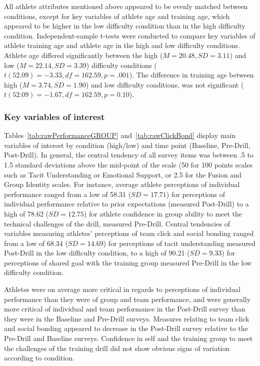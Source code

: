 \begin{CJK}{UTF8}{gbsn}
All athlete attributes mentioned above appeared to be evenly matched between conditions, except for key variables of athlete age and training age, which appeared to be higher in the low difficulty condition than in the high difficulty condition. Independent-sample t-tests were conducted to compare key variables of athlete training age and athlete age in the high and low difficulty conditions. Athlete age differed significantly between the high ($M= 20.48, SD =3.11$) and low ($M= 22.14, SD =3.39$) difficulty conditions ($t(52.09) = -3.33, df = 162.59, p = .001$).  The difference in training age between high ($M= 3.74, SD =1.90$) and low  difficulty conditions, was not significant ($t(52.09)= -1.67, df = 162.59, p = 0.10$).




\subsubsection{Key variables of interest \label{sect:surveyResponses}}
Tables~\ref{tab:rawPerformanceGROUP} and~\ref{tab:rawClickBond} display main variables of interest by condition (high/low) and time point (Baseline, Pre-Drill, Post-Drill).  In general, the central tendency of all survey items was between .5 to 1.5 standard deviations above the mid-point of the scale (50 for 100 points scales such as Tacit Understanding or Emotional Support, or 2.5 for the Fusion and Group Identity scales.   For instance, average athlete perceptions of individual performance ranged from a low of 58.31 ($SD = 17.71$) for perceptions of individual performance relative to prior expectations (measured Post-Drill) to a high of 78.62 ($SD = 12.75$) for athlete confidence in group ability to meet the technical challenges of the drill, measured Pre-Drill.  Central tendencies of variables measuring athletes' perceptions of team click and social bonding ranged from a low of 68.34 ($SD = 14.69$) for perceptions of tacit understanding measured Post-Drill in the low difficulty condition, to a high of 90.21 ($SD = 9.33$) for perceptions of shared goal with the training group measured Pre-Drill in the low difficulty condition.

Athletes were on average more critical in regards to perceptions of individual performance than they were of group and team performance, and were generally more critical of individual and team performance in the Post-Drill survey than they were in the Baseline and Pre-Drill surveys.  Measures relating to team click and social bonding appeared to decrease in the Post-Drill survey relative to the Pre-Drill and Baseline surveys. Confidence in self and the training group to meet the challenges of the training drill did not show obvious signs of variation according to condition.


\end{CJK}
